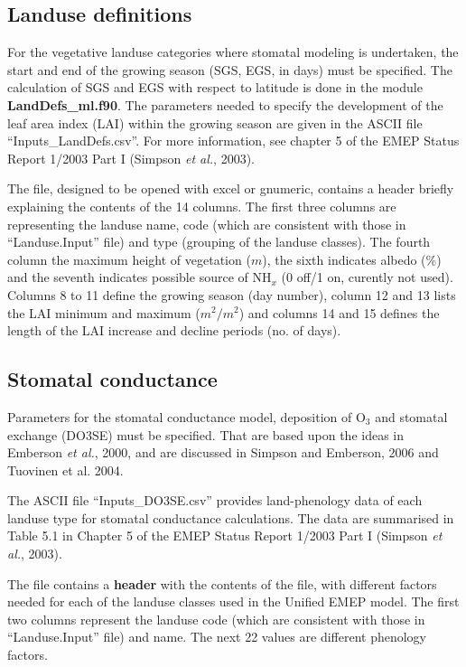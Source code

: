 \subsection{Landuse definitions}
For the vegetative landuse categories where stomatal modeling is
undertaken, the start and end of the growing season (SGS, EGS, in days) must be specified. 
The calculation of SGS and EGS with respect to latitude is done 
in the module {\bf LandDefs\_ml.f90}. 
The parameters needed to specify the
development of the leaf area index (LAI) within the growing season
are given in the ASCII file ``Inputs\_LandDefs.csv''. 
For more information, see chapter 5  of the EMEP Status Report 1/2003 Part I (Simpson {\sl et al.}, 2003).


The file, designed to be opened with excel or gnumeric,
contains a header briefly explaining the contents of the 
14 columns. 
The first three columns are representing the landuse name, code (which
are consistent with those in ``Landuse.Input'' file) and
type (grouping of the landuse classes). The fourth column 
the maximum height of vegetation ($m$), the sixth indicates albedo (\%) and
the seventh indicates possible source of NH$_{x}$ (0 off/1 on,
curently not used). Columns 8 to 11
define the growing season (day number), column 12 and 13 lists the
LAI minimum  and maximum ($m^{2}/m^{2}$) and 
columns 14 and 15
defines the length of the LAI increase and decline periods (no. of days).


\subsection{Stomatal conductance}
Parameters for the stomatal conductance model, deposition of O$_{3}$ and
stomatal exchange (DO3SE) must be specified. That are based upon the ideas in
Emberson {\sl et al.}, 2000, and are discussed in Simpson and Emberson,
2006 and Tuovinen et al. 2004.

The  ASCII file ``Inputs\_DO3SE.csv'' provides land-phenology data
of each landuse type for stomatal conductance calculations. The 
data are summarised in Table 5.1 in Chapter 5 of the EMEP 
Status Report 1/2003 Part I (Simpson {\sl et al.}, 2003).

The file contains a {\bf header} with the contents of the file,
with different factors needed for each of the landuse classes used
in the Unified EMEP model. The first two columns represent the
landuse code (which are consistent with those in ``Landuse.Input'' file)
and name. The next 22 values are different phenology factors.


